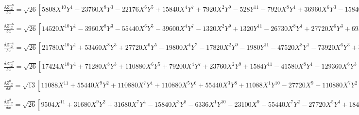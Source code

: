\documentclass[10pt,landscape]{article}
\begin{document}
\vspace{1.2 mm}
\noindent $ \frac{\delta Z^{-8}_{12}}{\delta x} = \sqrt{26} [5808X^{10}Y^{1} -23760X^{8}Y^{3} -22176X^{6}Y^{5} +15840X^{4}Y^{7} +7920X^{2}Y^{9} -528Y^{11} -7920X^{8}Y^{1} +36960X^{6}Y^{3} -15840X^{2}Y^{7} +880Y^{9} +2520X^{6}Y^{1} -12600X^{4}Y^{3} +7560X^{2}Y^{5} -360Y^{7}] $

\vspace{1.2 mm}
\noindent $ \frac{\delta Z^{-6}_{12}}{\delta x} = \sqrt{26} [14520X^{10}Y^{1} -3960X^{8}Y^{3} -55440X^{6}Y^{5} -39600X^{4}Y^{7} -1320X^{2}Y^{9} +1320Y^{11} -26730X^{8}Y^{1} +27720X^{6}Y^{3} +69300X^{4}Y^{5} +11880X^{2}Y^{7} -2970Y^{9} +15120X^{6}Y^{1} -25200X^{4}Y^{3} -15120X^{2}Y^{5} +2160Y^{7} -2520X^{4}Y^{1} +5040X^{2}Y^{3} -504Y^{5}] $

\vspace{1.2 mm}
\noindent $ \frac{\delta Z^{-4}_{12}}{\delta x} = \sqrt{26} [21780X^{10}Y^{1} +53460X^{8}Y^{3} +27720X^{6}Y^{5} -19800X^{4}Y^{7} -17820X^{2}Y^{9} -1980Y^{11} -47520X^{8}Y^{1} -73920X^{6}Y^{3} +31680X^{2}Y^{7} +5280Y^{9} +35280X^{6}Y^{1} +25200X^{4}Y^{3} -15120X^{2}Y^{5} -5040Y^{7} -10080X^{4}Y^{1} +2016Y^{5} +840X^{2}Y^{1} -280Y^{3}] $

\vspace{1.2 mm}
\noindent $ \frac{\delta Z^{-2}_{12}}{\delta x} = \sqrt{26} [17424X^{10}Y^{1} +71280X^{8}Y^{3} +110880X^{6}Y^{5} +79200X^{4}Y^{7} +23760X^{2}Y^{9} +1584Y^{11} -41580X^{8}Y^{1} -129360X^{6}Y^{3} -138600X^{4}Y^{5} -55440X^{2}Y^{7} -4620Y^{9} +35280X^{6}Y^{1} +75600X^{4}Y^{3} +45360X^{2}Y^{5} +5040Y^{7} -12600X^{4}Y^{1} -15120X^{2}Y^{3} -2520Y^{5} +1680X^{2}Y^{1} +560Y^{3} -42Y^{1}] $

\vspace{1.2 mm}
\noindent $ \frac{\delta Z^{0}_{12}}{\delta x} = \sqrt{13} [11088X^{11} +55440X^{9}Y^{2} +110880X^{7}Y^{4} +110880X^{5}Y^{6} +55440X^{3}Y^{8} +11088X^{1}Y^{10} -27720X^{9} -110880X^{7}Y^{2} -166320X^{5}Y^{4} -110880X^{3}Y^{6} -27720X^{1}Y^{8} +25200X^{7} +75600X^{5}Y^{2} +75600X^{3}Y^{4} +25200X^{1}Y^{6} -10080X^{5} -20160X^{3}Y^{2} -10080X^{1}Y^{4} +1680X^{3} +1680X^{1}Y^{2} -84X^{1}] $

\vspace{1.2 mm}
\noindent $ \frac{\delta Z^{2}_{12}}{\delta x} = \sqrt{26} [9504X^{11} +31680X^{9}Y^{2} +31680X^{7}Y^{4} -15840X^{3}Y^{8} -6336X^{1}Y^{10} -23100X^{9} -55440X^{7}Y^{2} -27720X^{5}Y^{4} +18480X^{3}Y^{6} +13860X^{1}Y^{8} +20160X^{7} +30240X^{5}Y^{2} -10080X^{1}Y^{6} -7560X^{5} -5040X^{3}Y^{2} +2520X^{1}Y^{4} +1120X^{3} -42X^{1}] $
\end{document}
